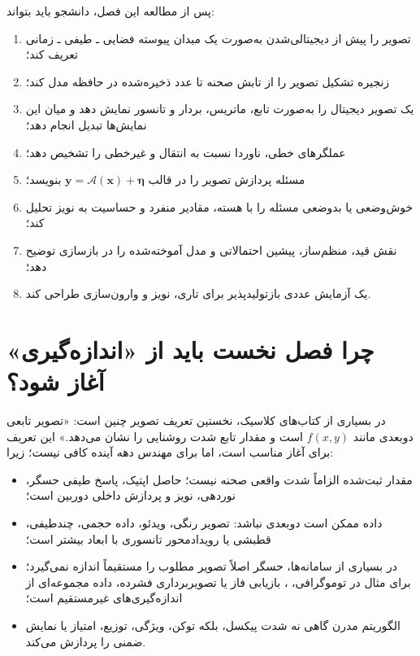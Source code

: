\documentclass[12pt,openany,oneside]{book}
\newcommand{\vect}[1]{\bm{#1}}
\newcommand{\op}[1]{\mathcal{#1}}
\begin{document}
\begin{learningbox}
پس از مطالعه این فصل، دانشجو باید بتواند:
\begin{enumerate}
\item تصویر را پیش از دیجیتالی‌شدن به‌صورت یک میدان پیوسته فضایی ـ طیفی ـ زمانی تعریف کند؛
\item زنجیره تشکیل تصویر را از تابش صحنه تا عدد ذخیره‌شده در حافظه مدل کند؛
\item یک تصویر دیجیتال را به‌صورت تابع، ماتریس، بردار و تانسور نمایش دهد و میان این نمایش‌ها تبدیل انجام دهد؛
\item عملگرهای خطی، ناوردا نسبت به انتقال و غیرخطی را تشخیص دهد؛
\item مسئله پردازش تصویر را در قالب \(\vect y=\op A(\vect x)+\vect\eta\) بنویسد؛
\item خوش‌وضعی یا بدوضعی مسئله را با هسته، مقادیر منفرد و حساسیت به نویز تحلیل کند؛
\item نقش قید، منظم‌ساز، پیشین احتمالاتی و مدل آموخته‌شده را در بازسازی توضیح دهد؛
\item یک آزمایش عددی بازتولیدپذیر برای تاری، نویز و وارون‌سازی طراحی کند.
\end{enumerate}
\end{learningbox}

\section{چرا فصل نخست باید از «اندازه‌گیری» آغاز شود؟}

در بسیاری از کتاب‌های کلاسیک، نخستین تعریف تصویر چنین است:
«تصویر تابعی دوبعدی مانند \(f(x,y)\) است و مقدار تابع شدت روشنایی را نشان می‌دهد.»
این تعریف برای آغاز مناسب است، اما برای مهندس دهه آینده کافی نیست؛ زیرا:
\begin{itemize}
\item مقدار ثبت‌شده الزاماً شدت واقعی صحنه نیست؛ حاصل اپتیک، پاسخ طیفی حسگر، نوردهی، نویز و پردازش داخلی دوربین است؛
\item داده ممکن است دوبعدی نباشد: تصویر رنگی، ویدئو، داده حجمی، چندطیفی، قطبشی یا رویدادمحور تانسوری با ابعاد بیشتر است؛
\item در بسیاری از سامانه‌ها، حسگر اصلاً تصویر مطلوب را مستقیماً اندازه نمی‌گیرد؛ برای مثال در توموگرافی، ، بازیابی فاز یا تصویربرداری فشرده، داده مجموعه‌ای از اندازه‌گیری‌های غیرمستقیم است؛
\item الگوریتم مدرن گاهی نه شدت پیکسل، بلکه توکن، ویژگی، توزیع، امتیاز یا نمایش ضمنی را پردازش می‌کند.
\end{itemize}
\end{document}
